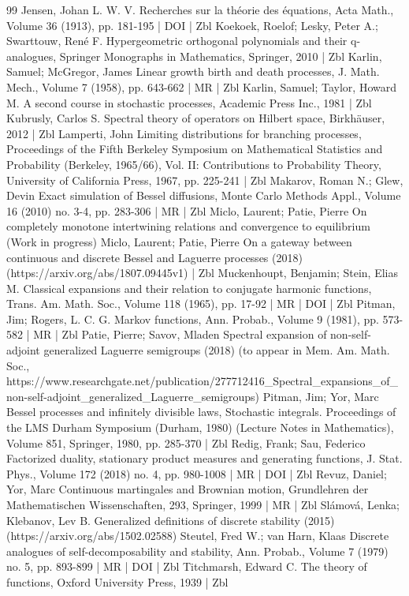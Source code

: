 \documentclass[10pt]{amsart}
\theoremstyle{definition}\newtheorem{defi}[theo]{Definition}\newtheorem{rema}[theo]{Remark}\newtheorem{exam}[theo]{Example}\newtheorem{exem}[theo]{Example}\newtheorem{nota}[theo]{Notation}
\begin{document}
\begin{thebibliography}{99}
Jensen, Johan L. W. V. Recherches sur la théorie des équations, Acta Math., Volume 36 (1913), pp. 181-195 | DOI | Zbl
Koekoek, Roelof; Lesky, Peter A.; Swarttouw, René F. Hypergeometric orthogonal polynomials and their q-analogues, Springer Monographs in Mathematics, Springer, 2010 | Zbl
Karlin, Samuel; McGregor, James Linear growth birth and death processes, J. Math. Mech., Volume 7 (1958), pp. 643-662 | MR | Zbl
Karlin, Samuel; Taylor, Howard M. A second course in stochastic processes, Academic Press Inc., 1981 | Zbl
Kubrusly, Carlos S. Spectral theory of operators on Hilbert space, Birkhäuser, 2012 | Zbl
Lamperti, John Limiting distributions for branching processes, Proceedings of the Fifth Berkeley Symposium on Mathematical Statistics and Probability (Berkeley, 1965/66), Vol. II: Contributions to Probability Theory, University of California Press, 1967, pp. 225-241 | Zbl
Makarov, Roman N.; Glew, Devin Exact simulation of Bessel diffusions, Monte Carlo Methods Appl., Volume 16 (2010) no. 3-4, pp. 283-306 | MR | Zbl
Miclo, Laurent; Patie, Pierre On completely monotone intertwining relations and convergence to equilibrium (Work in progress)
Miclo, Laurent; Patie, Pierre On a gateway between continuous and discrete Bessel and Laguerre processes (2018) (https://arxiv.org/abs/1807.09445v1) | Zbl
Muckenhoupt, Benjamin; Stein, Elias M. Classical expansions and their relation to conjugate harmonic functions, Trans. Am. Math. Soc., Volume 118 (1965), pp. 17-92 | MR | DOI | Zbl
Pitman, Jim; Rogers, L. C. G. Markov functions, Ann. Probab., Volume 9 (1981), pp. 573-582 | MR | Zbl
Patie, Pierre; Savov, Mladen Spectral expansion of non-self-adjoint generalized Laguerre semigroups (2018) (to appear in Mem. Am. Math. Soc., https://www.researchgate.net/publication/277712416\_Spectral\_expansions\_of\_non-self-adjoint\_generalized\_Laguerre\_semigroups)
Pitman, Jim; Yor, Marc Bessel processes and infinitely divisible laws, Stochastic integrals. Proceedings of the LMS Durham Symposium (Durham, 1980) (Lecture Notes in Mathematics), Volume 851, Springer, 1980, pp. 285-370 | Zbl
Redig, Frank; Sau, Federico Factorized duality, stationary product measures and generating functions, J. Stat. Phys., Volume 172 (2018) no. 4, pp. 980-1008 | MR | DOI | Zbl
Revuz, Daniel; Yor, Marc Continuous martingales and Brownian motion, Grundlehren der Mathematischen Wissenschaften, 293, Springer, 1999 | MR | Zbl
Slámová, Lenka; Klebanov, Lev B. Generalized definitions of discrete stability (2015) (https://arxiv.org/abs/1502.02588)
Steutel, Fred W.; van Harn, Klaas Discrete analogues of self-decomposability and stability, Ann. Probab., Volume 7 (1979) no. 5, pp. 893-899 | MR | DOI | Zbl
Titchmarsh, Edward C. The theory of functions, Oxford University Press, 1939 | Zbl
\end{thebibliography}
\end{document}
